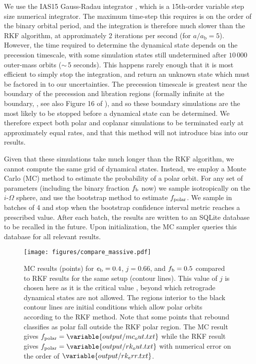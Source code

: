 \documentclass[twocolumn]{aastex631}
\begin{document}
We use the IAS15 Gauss-Radau integrator \citep{reboundias15}, which is a 15th-order variable step size numerical integrator. The maximum time-step this requires is on the order of the binary orbital period, and the integration is therefore much slower than the RKF algorithm, at approximately 2 iterations per second (for $a/a_\text{b}=5$). However, the time required to determine the dynamical state depends on the precession timescale, with some simulation states still undetermined after $10\,000$ outer-mass orbits ($\sim \,$5 seconds). This happens rarely enough that it is most efficient to simply stop the integration, and return an unknown state which must be factored in to our uncertainties. The precession timescale is greatest near the boundary of the precession and libration regions (formally infinite at the boundary, \citealt{farago2010}, see also Figure 16 of \citealt{rabago2024}), and so these boundary simulations are the most likely to be stopped before a dynamical state can be determined. We therefore expect both polar and coplanar simulations to be terminated early at approximately equal rates, and that this method will not introduce bias into our results.

Given that these simulations take much longer than the RKF algorithm, we cannot compute the same grid of dynamical states. Instead, we employ a Monte Carlo (MC) method to estimate the probability of a polar orbit. For any set of parameters (including the binary fraction $f_{\rm b}$ now) we sample isotropically on the $i$-$\Omega$ sphere, and use the bootstrap method to estimate $f_{\rm polar}$. We sample in batches of 4 and stop when the bootstrap confidence interval metric reaches a prescribed value. After each batch, the results are written to an SQLite database to be recalled in the future. Upon initialization, the MC sampler queries this database for all relevant results.


\begin{figure}
    \begin{centering}
        \texttt{[image: figures/compare\_massive.pdf]}
        \caption{
            MC results (points) for $e_{\rm b}=0.4$, $j=0.66$, and $f_{\rm b}=0.5$ compared to RKF results for the same setup (contour lines). This value of $j$ is chosen here as it is the critical value \citep[see][]{martin2019,abod2022}, beyond which retrograde dynamical states are not allowed. The regions interior to the black contour lines are initial conditions which allow polar orbits according to the RKF method.
            Note that some points that {\sc rebound} classifies as polar fall outside the RKF polar region.
            The MC result gives $f_{\text{polar}} = \variable{output/mc_out.txt}$ while the RKF result gives $f_{\text{polar}} = \variable{output/rk_out.txt}$ with
            numerical error on the order of $\variable{output/rk_err.txt}$.
        }
        \label{fig:rkf}
    \end{centering}
\end{figure}
\end{document}

